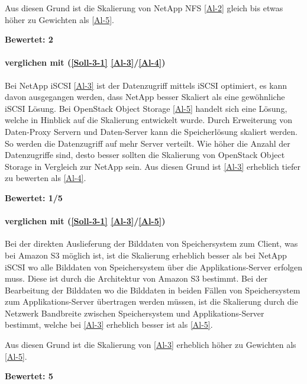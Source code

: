 Aus diesen Grund ist die Skalierung von NetApp NFS \ref{Al-2} gleich bis etwas höher zu Gewichten als \ref{Al-5}.

\textbf{Bewertet: 2}

\paragraph*{  verglichen mit  (\ref{Soll-3-1} \ref{Al-3}/\ref{Al-4})}
Bei NetApp iSCSI \ref{Al-3} ist der Datenzugriff mittels iSCSI optimiert, es kann davon ausgegangen werden, dass NetApp besser Skaliert als eine gewöhnliche iSCSI Lösung. Bei OpenStack Object Storage \ref{Al-5} handelt sich eine Lösung, welche in Hinblick auf die Skalierung entwickelt wurde. Durch Erweiterung von Daten-Proxy Servern und Daten-Server kann die Speicherlösung skaliert werden. So werden die Datenzugriff auf mehr Server verteilt. Wie höher die Anzahl der Datenzugriffe sind, desto besser sollten die Skalierung von OpenStack Object Storage in Vergleich zur NetApp sein.
Aus diesen Grund ist  \ref{Al-3} erheblich tiefer zu bewerten als  \ref{Al-4}.

\textbf{Bewertet: 1/5}

\paragraph*{  verglichen mit  (\ref{Soll-3-1} \ref{Al-3}/\ref{Al-5})}
Bei der direkten Auslieferung der Bilddaten von Speichersystem zum Client, was bei Amazon S3 möglich ist, ist die Skalierung erheblich besser als bei NetApp iSCSI wo alle Bilddaten von Speichersystem über die Applikations-Server erfolgen muss. Diese ist durch die Architektur von Amazon S3 bestimmt. Bei der Bearbeitung der Bilddaten wo die Bilddaten in beiden Fällen von Speichersystem zum Applikations-Server übertragen werden müssen, ist die Skalierung durch die Netzwerk Bandbreite zwischen Speichersystem und Applikations-Server bestimmt, welche bei \ref{Al-3} erheblich besser ist als \ref{Al-5}.

Aus diesen Grund ist die Skalierung von  \ref{Al-3} erheblich höher zu Gewichten als  \ref{Al-5}.

\textbf{Bewertet: 5}


